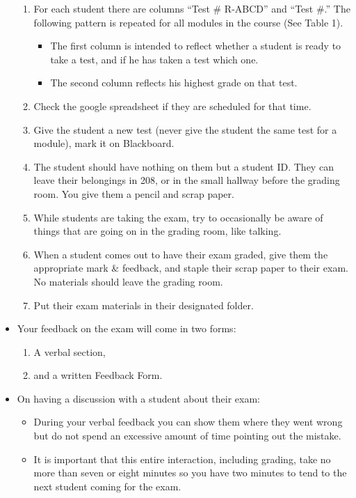 \documentclass[12pt]{article}
\begin{document}
\begin{itemize}
\begin{enumerate}
			\item For each student there are columns ``Test \# R-ABCD'' and ``Test \#.'' The following pattern is repeated for all modules in the course (See Table 1).
				\begin{itemize}
					\item The first column is intended to reflect whether a student is ready to take a test, and if he has taken a test which one.
					\item The second column reflects his highest grade on that test.
				\end{itemize}
			\item Check the google spreadsheet if they are scheduled for that time.
			\item Give the student a new test (never give the student the same test for a module), mark it on Blackboard.
			\item The student should have nothing on them but a student ID. They can leave their belongings in 208, or in the small hallway before the grading room. You give them a pencil and scrap paper.
			\item While students are taking the exam, try to occasionally be aware of things that are going on in the grading room, like talking.
			\item When a student comes out to have their exam graded, give them the appropriate mark \& feedback, and staple their scrap paper to their exam. No materials should leave the grading room.
			\item Put their exam materials in their designated folder.
		\end{enumerate}
	\item Your feedback on the exam will come in two forms:
		\begin{enumerate}
			\item A verbal section,
			\item and a written Feedback Form.
		\end{enumerate}
	\item On having a discussion with a student about their exam:
		\begin{itemize}
			\item During your verbal feedback you can show them where they went wrong but do not spend an excessive amount of time pointing out the mistake.
			\item It is important that this entire interaction, including grading, take no more than seven or eight minutes so you have two minutes to tend to the next student coming for the exam.

\end{itemize}
\end{itemize}
\end{document}
